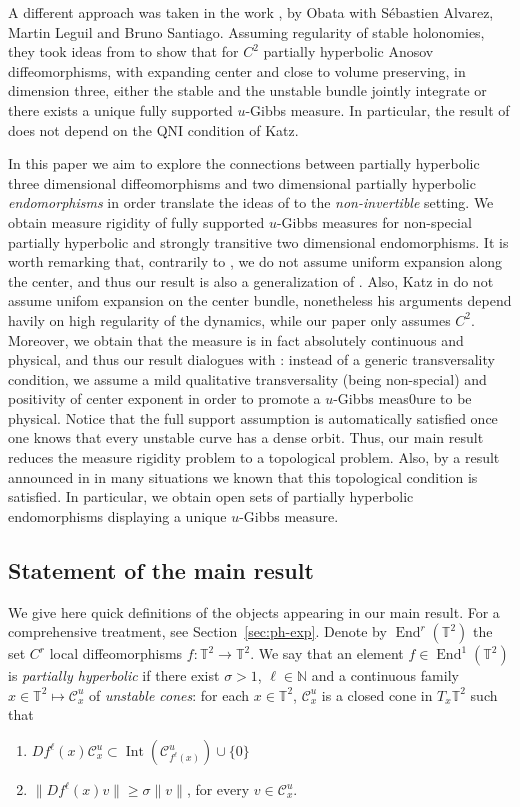 \documentclass[a4paper,11pt,reqno]{amsart}
\newcommand{\N}{{\mathbb N}}
\newcommand{\TT}{{\mathbb{T}^2}}
\newcommand{\cC}{{\mathcal C}}
\theoremstyle{definition}
\begin{document}
A different approach was taken in the work \cite{ALOS}, by Obata with Sébastien Alvarez, Martin Leguil and Bruno Santiago. Assuming regularity of stable holonomies, they took ideas from \cite{BRH,EskinMirzakhani,EskinLind} to show that for $C^2$ partially hyperbolic Anosov diffeomorphisms, with expanding center and close to volume preserving, in dimension three, either the stable and the unstable bundle jointly integrate or there exists a unique fully supported $u$-Gibbs measure. In particular, the result of \cite{ALOS} does not depend on the QNI condition of Katz. 

In this paper we aim to explore the connections between partially hyperbolic three dimensional diffeomorphisms and two dimensional partially hyperbolic \emph{endomorphisms} in order translate the ideas of \cite{ALOS} to the \emph{non-invertible} setting. We obtain measure rigidity of fully supported $u$-Gibbs measures for non-special partially hyperbolic and strongly transitive two dimensional endomorphisms. It is worth remarking that, contrarily to \cite{ALOS}, we do not assume uniform expansion along the center, and thus our result is also a generalization of \cite{ALOS}. Also, Katz in \cite{Katz} do not assume unifom expansion on the center bundle, nonetheless his arguments depend havily on high regularity of the dynamics, while our paper only assumes $C^2$. Moreover, we obtain that the measure is in fact absolutely continuous and physical, and thus our result dialogues with \cite{Tsujii}: instead of a generic transversality condition, we assume a mild qualitative transversality (being non-special) and positivity of center exponent in order to promote a $u$-Gibbs meas0ure to be physical. Notice that the full support assumption is automatically satisfied once one knows that every unstable curve has a dense orbit. Thus, our main result reduces the measure rigidity problem to a topological problem. Also, by a result announced in \cite{ACEPWZ} in many situations we known that this topological condition is satisfied. In particular, we obtain open sets of partially hyperbolic endomorphisms displaying a unique $u$-Gibbs measure.  

\subsection{Statement of the main result}
\label{sec:intro-statement}
We give here quick definitions of the objects appearing in our main result. For a comprehensive treatment, see Section~\ref{sec:ph-exp}. Denote by $\operatorname{End}^r(\TT)$ the set $C^r$ local diffeomorphisms $f:\TT\to\TT$. We say that an element $f\in\operatorname{End}^1(\TT)$ is \emph{partially hyperbolic} if there exist $\sigma>1$, $\ell\in\N$ and a continuous family $x\in\TT\mapsto\cC^u_x$ of \emph{unstable cones}: for each $x\in\TT$, $\cC^u_x$ is a closed cone in $T_x\TT$ such that 
\begin{enumerate}
    \item[(i)] $Df^{\ell}(x)\cC^u_x\subset\operatorname{Int}(\cC^u_{f^{\ell}(x)})\cup\{0\}$
    \item[(ii)] $\|Df^{\ell}(x)v\|\geq\sigma\|v\|$, for every $v\in\cC^u_x$.
\end{enumerate}
\end{document}
